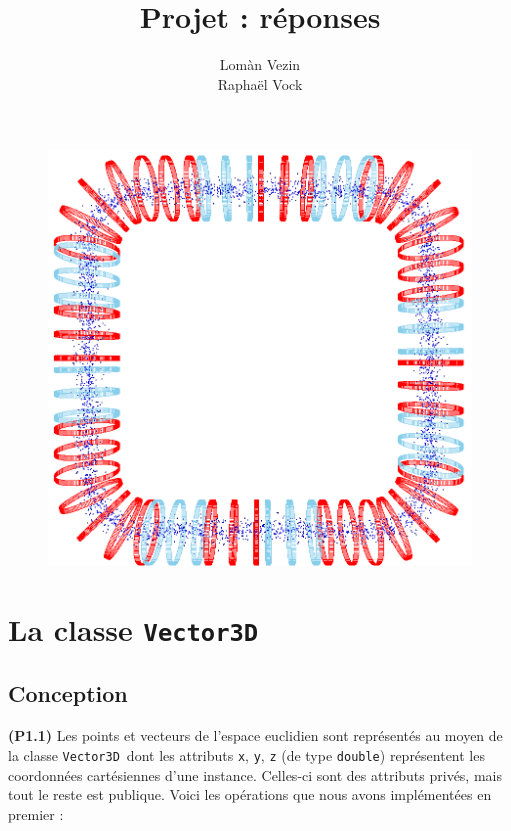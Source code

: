 \documentclass[12pt, letterpaper, twoside]{article}
\title{Projet : réponses}
\author{Lomàn Vezin \\ Raphaël Vock}
\newcommand{\T}[1]{\texttt{#1}}
\newcommand{\V}[0]{\texttt{Vector3D}}
\newcommand{\double}{\texttt{double}}
\begin{document}
\maketitle

\thispagestyle{empty}
\begin{figure}[b!]
	\centering
	\includegraphics[width=5in]{images/accelerator.png}
	\vspace{20pt}
\end{figure}
\newpage

\addtocounter{page}{-1}
\section{La classe \T{Vector3D}}
\subsection{Conception}
\noindent \textbf{(P1.1)} Les points et vecteurs de l'espace euclidien sont représentés au moyen de la classe \V\ dont les attributs \T{x}, \T{y}, \T{z} (de type \double) représentent les coordonnées cartésiennes d'une instance. Celles-ci sont des attributs privés, mais tout le reste est publique. Voici les opérations que nous avons implémentées en premier :
\end{document}

